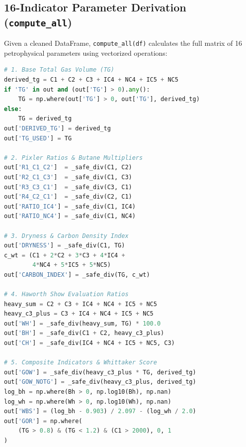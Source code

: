 \subsection{16-Indicator Parameter Derivation (\texttt{compute\_all})}
Given a cleaned DataFrame, \texttt{compute\_all(df)} calculates the full matrix of 16 petrophysical parameters using vectorized operations:
\begin{lstlisting}[language=Python, caption={Vectorized petrophysical parameter calculation in \texttt{engine.py}}]
# 1. Base Total Gas Volume (TG)
derived_tg = C1 + C2 + C3 + IC4 + NC4 + IC5 + NC5
if 'TG' in out and (out['TG'] > 0).any():
    TG = np.where(out['TG'] > 0, out['TG'], derived_tg)
else:
    TG = derived_tg
out['DERIVED_TG'] = derived_tg
out['TG_USED'] = TG

# 2. Pixler Ratios & Butane Multipliers
out['R1_C1_C2']  = _safe_div(C1, C2)
out['R2_C1_C3']  = _safe_div(C1, C3)
out['R3_C3_C1']  = _safe_div(C3, C1)
out['R4_C2_C1']  = _safe_div(C2, C1)
out['RATIO_IC4'] = _safe_div(C1, IC4)
out['RATIO_NC4'] = _safe_div(C1, NC4)

# 3. Dryness & Carbon Density Index
out['DRYNESS'] = _safe_div(C1, TG)
c_wt = (C1 + 2*C2 + 3*C3 + 4*IC4 + 
        4*NC4 + 5*IC5 + 5*NC5)
out['CARBON_INDEX'] = _safe_div(TG, c_wt)

# 4. Haworth Show Evaluation Ratios
heavy_sum = C2 + C3 + IC4 + NC4 + IC5 + NC5
heavy_c3_plus = C3 + IC4 + NC4 + IC5 + NC5
out['WH'] = _safe_div(heavy_sum, TG) * 100.0
out['BH'] = _safe_div(C1 + C2, heavy_c3_plus)
out['CH'] = _safe_div(IC4 + NC4 + IC5 + NC5, C3)

# 5. Composite Indicators & Whittaker Score
out['GOW'] = _safe_div(heavy_c3_plus * TG, derived_tg)
out['GOW_NOTG'] = _safe_div(heavy_c3_plus, derived_tg)
log_bh = np.where(Bh > 0, np.log10(Bh), np.nan)
log_wh = np.where(Wh > 0, np.log10(Wh), np.nan)
out['WBS'] = (log_bh - 0.903) / 2.097 - (log_wh / 2.0)
out['GOR'] = np.where(
    (TG > 0.8) & (TG < 1.2) & (C1 > 2000), 0, 1
)
\end{lstlisting}

